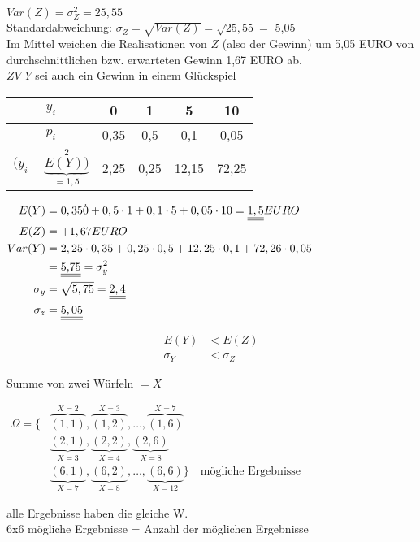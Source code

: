 $Var(Z) = \sigma_Z^2 = 25,55$\\
Standardabweichung: $\sigma_Z = \sqrt{Var(Z)} = \sqrt{25,55} = $ \underline{\underline{5,05}} \\

Im Mittel weichen die Realisationen von $Z$ (also der Gewinn) um 5,05 EURO von durchschnittlichen bzw. erwarteten Gewinn 1,67 EURO ab.\\

$ZV$ $Y$ sei auch ein Gewinn in einem Glückspiel

\begin{tabular}{c | c c c c}
	$y_i$		&		0		&		1		&		5		&		10	\\
	\hline
	$p_i$		&	0,35	& 0,5		&		0,1	&	0,05  \\
	$(y_i -\underbrace{E(Y))}_{= 1,5}^2$
					&	2,25	&	0,25	&	12,15	&	72,25
\end{tabular}

$\begin{aligned}
	E(Y) &= 0,35 \dot 0 + 0,5 \cdot 1 + 0,1 \cdot 5 + 0,05 \cdot 10 =
	\underline{\underline{1,5}} EURO \\
%
	E(Z) &= +1,67  EURO \\
%
	Var(Y) &= 2,25 \cdot 0,35 + 0,25 \cdot 0,5 + 12,25 \cdot 0,1 +
	72,26 \cdot 0,05 \\
	&= \text{\underline{\underline{5,75}}} = \sigma_y^2\\
%
	\sigma_y &= \sqrt{5,75} = \underline{\underline{2,4}} \\
%
	\sigma_z &= \underline{\underline{5,05}} \\
\end{aligned}$

$$\begin{aligned}
	E(Y)		 &<	E(Z) \\
	\sigma_Y &< \sigma_Z
\end{aligned}$$

Summe von zwei Würfeln $ = X$

$\begin{aligned}
\Omega = \{& \overbrace{(1,1)}^{X=2}, \overbrace{(1,2)}^{X=3}, \dots , 
	\overbrace{(1,6)}^{X=7} \\
					 & \underbrace{(2,1)}_{X=3}, \underbrace{(2,2)}_{X=4}, 
	\underbrace{(2,6)}_{X=8} \\
	 				 & \underbrace{(6,1)}_{X=7}, \underbrace{(6,2)}_{X=8}, \dots ,
	\underbrace{(6,6)}_{X=12}\} \quad \text{mögliche Ergebnisse}
\end{aligned}$
\par
alle Ergebnisse haben die gleiche W. \\
6x6 mögliche Ergebnisse = Anzahl der möglichen Ergebnisse

